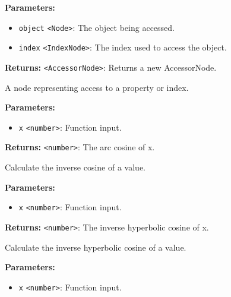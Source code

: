 \documentclass[12pt,a4paper]{article}
\begin{document}
\noindent \textbf{Parameters:}
\begin{itemize}
  \item \texttt{object} \texttt{<Node>}: The object being accessed.
  \item \texttt{index} \texttt{<IndexNode>}: The index used to access the object.
\end{itemize}

\noindent \textbf{Returns:} \texttt{<AccessorNode>}: Returns a new AccessorNode.

\noindent A node representing access to a property or index.

\vspace{5mm}
\noindent {}


\noindent \textbf{Parameters:}
\begin{itemize}
  \item \texttt{x} \texttt{<number>}: Function input.
\end{itemize}

\noindent \textbf{Returns:} \texttt{<number>}: The arc cosine of \textasciigrave{}x\textasciigrave{}.

\noindent Calculate the inverse cosine of a value.

\vspace{5mm}
\noindent {}


\noindent \textbf{Parameters:}
\begin{itemize}
  \item \texttt{x} \texttt{<number>}: Function input.
\end{itemize}

\noindent \textbf{Returns:} \texttt{<number>}: The inverse hyperbolic cosine of \textasciigrave{}x\textasciigrave{}.

\noindent Calculate the inverse hyperbolic cosine of a value.

\vspace{5mm}
\noindent {}


\noindent \textbf{Parameters:}
\begin{itemize}
  \item \texttt{x} \texttt{<number>}: Function input.
\end{itemize}
\end{document}
